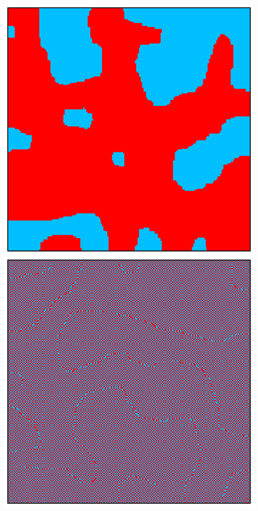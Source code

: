 \begin{figure}[h]
    \centering 
    \hfill\begin{minipage}[c]{0.45\textwidth}
        \centering
        \includegraphics[scale=0.45]{./images/ising/T_001_ferro.eps}
    \end{minipage}%
    \hfill
    \begin{minipage}[c]{0.45\textwidth}
        \centering
        \includegraphics[scale=0.45]{./images/ising/T_n001_ferro.eps}

\end{minipage}
\end{figure}
